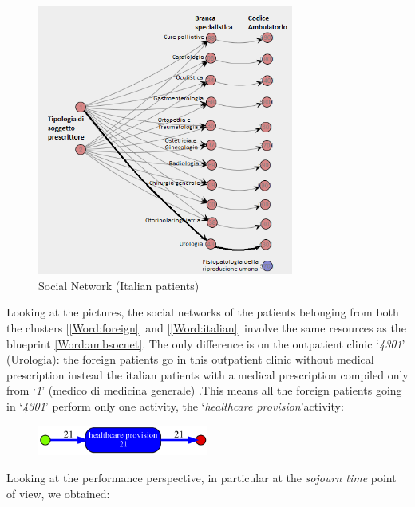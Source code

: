 \begin{figure}
\includegraphics[width=0.75\textwidth, keepaspectratio]{AmbulatoriSocialNetworkItalians}
\caption{Social Network (Italian patients)}
\end{figure}
\noindent
Looking at the pictures, the social networks of the patients belonging from both the clusters [\ref{Word:foreign}] and [\ref{Word:italian}] involve the same resources as the blueprint \ref{Word:ambsocnet}. The only difference is on the outpatient clinic `\textit{4301}' (Urologia): the foreign patients go in this outpatient clinic without medical prescription instead the italian patients with a medical prescription compiled only from `\textit{1}' (medico di medicina generale) .This means all the foreign patients going in `\textit{4301}' perform only one activity, the `\textit{healthcare provision}'activity:
\begin{figure} [htbp]
\includegraphics[width=0.5\textwidth, keepaspectratio]{AmbulatoriInductiveVisualMinerForeigns4301}
\end{figure}
\clearpage
\noindent
Looking at the performance perspective, in particular at the \textit{sojourn time} point of view, we obtained:
